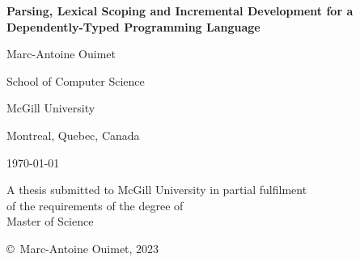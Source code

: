 \begin{titlepage}
\centering

\vspace*{0.5cm}

{\bfseries\LARGE Parsing, Lexical Scoping and Incremental Development for a Dependently-Typed Programming Language}

\vspace{1.8cm}

{\large Marc-Antoine Ouimet}

\vspace{2cm}

School of Computer Science

McGill University

Montreal, Quebec, Canada

\vspace{1.5cm}

\monthyeardate\today

\vspace{2cm}

A thesis submitted to McGill University in partial fulfilment\\
of the requirements of the degree of\\
Master of Science

\vfill

\copyright\ Marc-Antoine Ouimet, 2023
\end{titlepage}
